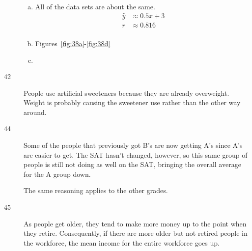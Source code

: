 \documentclass[letterpaper, landscape]{exam}
\begin{document}
\begin{description}
        \begin{enumerate}[(a)]
          \item
            All of the data sets are about the same.
            \begin{align*}
              \hat{y} & \approx 0.5 x + 3 \\
              r       & \approx 0.816 \\
            \end{align*}

          \item Figures~\ref{fig:38a}-\ref{fig:38d}

          \item
        \end{enumerate}

      \item[42]
        People use artificial sweeteners because they are already overweight.
        Weight is probably causing the sweetener use rather than the other way
        around.

      \item[44]
        Some of the people that previously got B's are now getting A's since A's
        are easier to get.  The SAT hasn't changed, however, so this same group
        of people is still not doing as well on the SAT, bringing the overall
        average for the A group down.

        The same reasoning applies to the other grades.

      \item[45]
        As people get older, they tend to make more money up to the point when
        they retire.  Consequently, if there are more older but not retired
        people in the workforce, the mean income for the entire workforce goes
        up.


\end{description}
\end{document}
